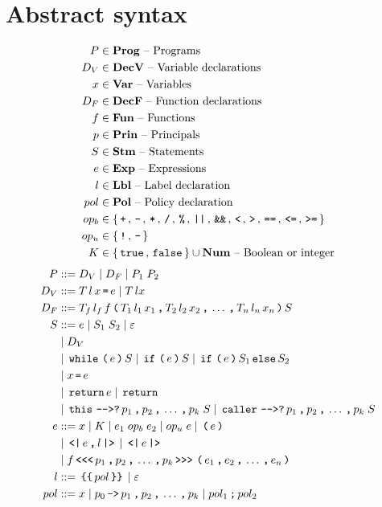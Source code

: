 \section{Abstract syntax}

\begin{align*}
  P       & \in \mathbf{Prog} \text{ -- Programs}\\
  D_V     & \in \mathbf{DecV} \text{ -- Variable declarations}\\
  x       & \in \mathbf{Var} \text{ -- Variables}\\
  D_F     & \in \mathbf{DecF} \text{ -- Function declarations}\\
  f       & \in \mathbf{Fun} \text{ -- Functions}\\
  p       & \in \mathbf{Prin} \text{ -- Principals}\\
  S       & \in \mathbf{Stm} \text{ -- Statements}\\
  e       & \in \mathbf{Exp} \text{ -- Expressions}\\
  l       & \in \mathbf{Lbl} \text{ -- Label declaration}\\
  pol     & \in \mathbf{Pol} \text{ -- Policy declaration}\\
  op_b    & \in \{ \, \texttt{+} \, ,  \, \texttt{-} \, ,  \, \texttt{*} \, ,  \, \texttt{/} \, ,  \, \texttt{\%} \, ,  \, \texttt{||} \, ,  \, \texttt{\&\&} \, ,  \, \texttt{<} \, ,  \, \texttt{>} \, ,  \, \texttt{==} \, ,  \, \texttt{<=} \, ,  \, \texttt{>=} \, \} \\
  op_u    & \in \{ \, \texttt{!} \, ,  \, \texttt{-} \, \} \\
  K       & \in \{ \, \texttt{true} \,, \, \texttt{false} \, \} \cup \mathbf{Num} \text{ -- Boolean or integer}
\end{align*}
\begin{align*}
  P         & ::= D_V \gp D_F \gp P_1 \; P_2 \\
  D_V       & ::= T \, l \, x \tk = e \gp T \, l x \\
  D_F       & ::= T_f \, l_f \, f \tk ( T_1 \, l_1 \, x_1 \tk , T_2 \, l_2 \, x_2 \tk , \dots \tk , T_n \, l_n \, x_n \tk ) S \\
  S         & ::= e \gp S_1 \; S_2 \gp \varepsilon \\
            & \gp D_V \\
            & \gp \tk{while} \tk ( e \tk ) S \gp \tk{if} \tk ( e \tk ) S \gp \tk{if} \tk ( e \tk ) S_1 \tk{else} S_2 \\
            & \gp x \tk = e \\
            & \gp \tk{return} e \gp \tk{return} \\
            & \gp \tk{this} \tk{-{}->?} p_1 \tk , p_2 \tk , \dots \tk , p_k \; S \gp \tk{caller} \tk{-{}->?} p_1 \tk , p_2 \tk , \dots \tk , p_k \; S \\
  e         & ::= x \gp K \gp e_1 \; op_b \; e_2 \gp op_u \; e \gp \tk ( e \tk ) \\
            & \gp \tk{<|} e \tk , l \tk{|>} \gp \tk{<|} e \tk{|>} \\
            & \gp f \tk{<{}<{}<} p_1 \tk , p_2 \tk , \dots \tk , p_k \tk{>{}>{}>} \tk ( e_1 \tk , e_2 \tk , \dots \tk , e_n \tk ) \\
  l         & ::= \tk{\{\{} pol \tk{\}\}} \gp \varepsilon \\
  pol       & ::= x \gp p_0 \tk{->} p_1 \tk , p_2 \tk , \dots \tk , p_k \gp pol_1 \tk ; pol_2
\end{align*}
